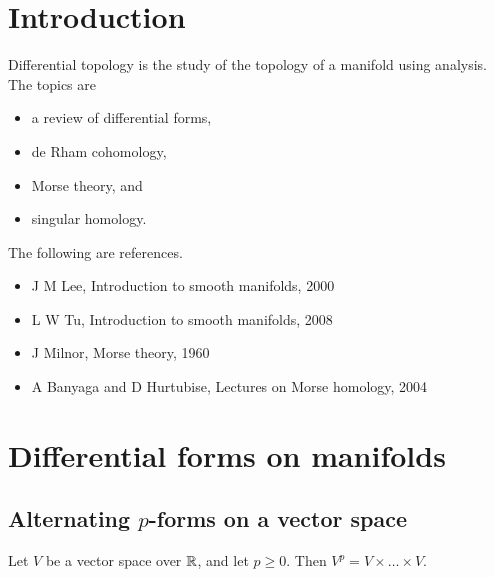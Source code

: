 \def\syllabus{Differential forms on manifolds. Integrations on manifolds. Stokes' theorem. De Rham cohomology. Homotopy invariance. The Mayer-Vietoris sequence. Compactly supported de Rham cohomology. Poincar\'e duality. Degree of a morphism. CW-complexes. The CW-structure associated to a Morse function. The fundamental theorems of Morse theory. Morse homology. Singular homology. Singular cohomology.}
\def\thm{section}







\section{Introduction}


Differential topology is the study of the topology of a manifold using analysis. The topics are
\begin{itemize}
\item a review of differential forms,
\item de Rham cohomology,
\item Morse theory, and
\item singular homology.
\end{itemize}
The following are references.
\begin{itemize}
\item J M Lee, Introduction to smooth manifolds, 2000
\item L W Tu, Introduction to smooth manifolds, 2008
\item J Milnor, Morse theory, 1960
\item A Banyaga and D Hurtubise, Lectures on Morse homology, 2004
\end{itemize}

\pagebreak

\section{Differential forms on manifolds}

\subsection{Alternating \texorpdfstring{$ p $}{p}-forms on a vector space}

Let $ V $ be a vector space over $ \mathbb{R} $, and let $ p \ge 0 $. Then $ V^p = V \times \dots \times V $.

